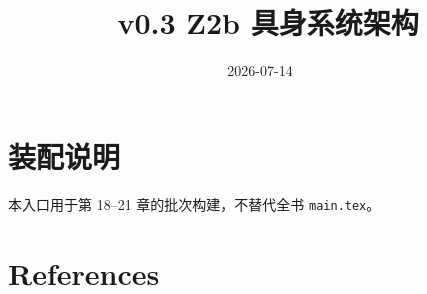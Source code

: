 \documentclass[UTF8,a4paper,12pt,openany]{ctexbook}
\title{\ReportTitle\ v0.3 Z2b 具身系统架构}
\author{\ReportAuthor}
\date{2026-07-14}
\begin{document}
\frontmatter
\maketitle
\chapter*{装配说明}
本入口用于第 18--21 章的批次构建，不替代全书 \texttt{main.tex}。
\tableofcontents

\mainmatter
\setcounter{chapter}{17}





\backmatter
\chapter{References}
\printbibliography[heading=none]
\end{document}
